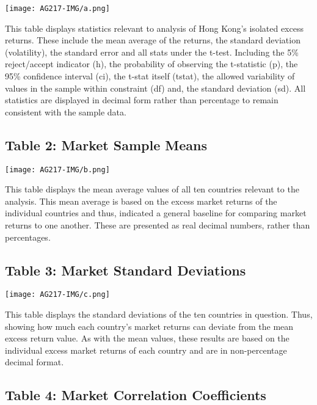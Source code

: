 \documentclass[11pt, english]{article}
\begin{document}
	\begin{center}
                \texttt{[image: AG217-IMG/a.png]}
        \end{center}

	This table displays statistics relevant to analysis of Hong Kong’s isolated excess returns. These include the mean average of the returns, the standard deviation (volatility), the standard error and all stats under the t-test. Including the 5\% reject/accept indicator (h), the probability of observing the t-statistic (p), the 95\% confidence interval (ci), the t-stat itself (tstat), the allowed variability of values in the sample within constraint (df) and, the standard deviation (sd). All statistics are displayed in decimal form rather than percentage to remain consistent with the sample data. 

	\subsection{Table 2: Market Sample Means}

	\begin{center}
                \texttt{[image: AG217-IMG/b.png]}    
        \end{center}

	This table displays the mean average values of all ten countries relevant to the analysis. This mean average is based on the excess market returns of the individual countries and thus, indicated a general baseline for comparing market returns to one another. These are presented as real decimal numbers, rather than percentages.

	\subsection{Table 3: Market Standard Deviations}

	\begin{center}
                \texttt{[image: AG217-IMG/c.png]}    
        \end{center}

	This table displays the standard deviations of the ten countries in question. Thus, showing how much each country’s market returns can deviate from the mean excess return value. As with the mean values, these results are based on the individual excess market returns of each country and are in non-percentage decimal format.

	\subsection{Table 4: Market Correlation Coefficients}
\end{document}
